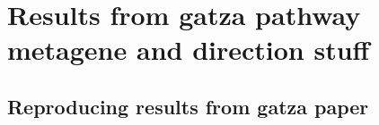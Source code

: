 \chapter{Results from gatza pathway metagene and direction stuff}

\section{Reproducing results from gatza paper}

